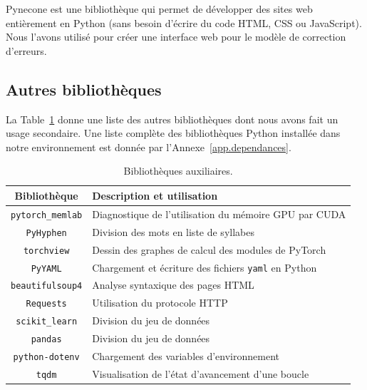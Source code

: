 Pynecone est une bibliothèque qui permet de développer des sites web entièrement en Python
(sans besoin d'écrire du code HTML, CSS ou JavaScript).
Nous l'avons utilisé pour créer une interface web pour le modèle de correction d'erreurs.

\subsection{Autres bibliothèques}%
\label{subsec.other-lib}

La Table~\ref{tab.other-lib} donne une liste des autres bibliothèques 
dont nous avons fait un usage secondaire.
Une liste complète des bibliothèques Python installée dans notre environnement 
est donnée par l'Annexe~\ref{app.dependances}.

\begin{table}[hbt]
    \begin{tabular}{|c|l|}
        \hline
        \textbf{Bibliothèque} & \textbf{Description et utilisation}                       \\
        \hline
        \verb|pytorch_memlab| & Diagnostique de l'utilisation du mémoire GPU par CUDA     \\
        \hline
        \verb|PyHyphen|       & Division des mots en liste de syllabes                    \\
        \hline
        \verb|torchview|      & Dessin des graphes de calcul des modules de PyTorch       \\
        \hline
        \verb|PyYAML|         & Chargement et écriture des fichiers \verb|yaml| en Python \\
        \hline
        \verb|beautifulsoup4| & Analyse syntaxique des pages HTML                         \\
        \hline
        \verb|Requests|       & Utilisation du protocole HTTP                             \\
        \hline
        \verb|scikit_learn|   & Division du jeu de données                                \\
        \hline
        \verb|pandas|         & Division du jeu de données                                \\
        \hline
        \verb|python-dotenv|  & Chargement des variables d'environnement                  \\
        \hline
        \verb|tqdm|           & Visualisation de l'état d'avancement d'une boucle         \\
        \hline
    \end{tabular}
    \caption{Bibliothèques auxiliaires.}
    \label{tab.other-lib}
\end{table}